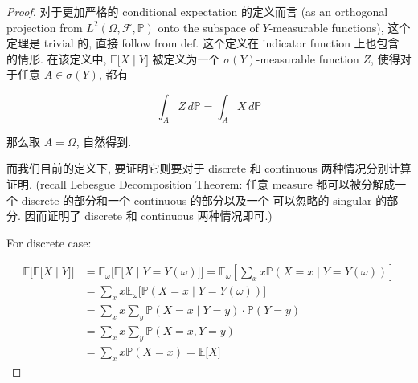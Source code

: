 \begin{proof}

对于更加严格的 conditional expectation 的定义而言 (as an orthogonal projection from \(\mathit{L}^{2}(\Omega,\mathcal{F},\mathbb{P})\) onto the subspace of \(\mathit{Y}\)-measurable functions), 这个定理是 trivial 的, 直接 follow from def. 这个定义在 indicator function 上也包含  的情形. 在该定义中, \(\left. \mathbb{E}\lbrack\mathit{X} \middle| \mathit{Y}\rbrack \right.\) 被定义为一个 \(\mathit{\sigma}(\mathit{Y})\)-measurable function \(\mathit{Z}\), 使得对于任意 \(\mathit{A} \in \mathit{\sigma}(\mathit{Y})\), 都有

\[\int_{\mathit{A}}\mathit{Z}\,\mathit{d}\mathbb{P} = \int_{\mathit{A}}\mathit{X}\,\mathit{d}\mathbb{P}\]

那么取 \(\mathit{A} = \Omega\), 自然得到.

而我们目前的定义下, 要证明它则要对于 discrete 和 continuous 两种情况分别计算证明. (recall Lebesgue Decomposition Theorem: 任意 measure 都可以被分解成一个 discrete 的部分和一个 continuous 的部分以及一个 可以忽略的 singular 的部分. 因而证明了 discrete 和 continuous 两种情况即可.)

For discrete case:

\[\begin{matrix}
{\mathbb{E}\lbrack\mathbb{E}\lbrack\mathit{X} \mid \mathit{Y}\rbrack\rbrack} & {= \mathbb{E}_{\mathit{\omega}}\lbrack\mathbb{E}\lbrack\mathit{X} \mid \mathit{Y} = \mathit{Y}(\mathit{\omega})\rbrack\rbrack = \mathbb{E}_{\mathit{\omega}}\left\lbrack {\sum\limits_{\mathit{x}}\mathit{x}\mathbb{P}(\mathit{X} = \mathit{x} \mid \mathit{Y} = \mathit{Y}(\mathit{\omega}))} \right\rbrack} \\
 & {= \sum\limits_{\mathit{x}}\mathit{x}\mathbb{E}_{\mathit{\omega}}\lbrack\mathbb{P}(\mathit{X} = \mathit{x} \mid \mathit{Y} = \mathit{Y}(\mathit{\omega}))\rbrack} \\
 & {= \sum\limits_{\mathit{x}}\mathit{x}\sum\limits_{\mathit{y}}\mathbb{P}(\mathit{X} = \mathit{x} \mid \mathit{Y} = \mathit{y}) \cdot \mathbb{P}(\mathit{Y} = \mathit{y})} \\
 & {= \sum\limits_{\mathit{x}}\mathit{x}\sum\limits_{\mathit{y}}\mathbb{P}(\mathit{X} = \mathit{x},\mathit{Y} = \mathit{y})} \\
 & {= \sum\limits_{\mathit{x}}\mathit{x}\mathbb{P}(\mathit{X} = \mathit{x}) = \mathbb{E}\lbrack\mathit{X}\rbrack}
\end{matrix}\]


\end{proof}
